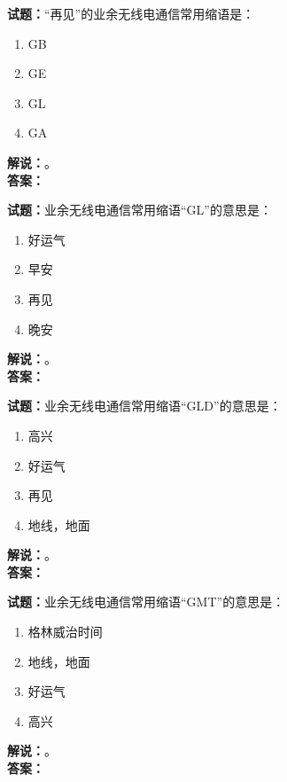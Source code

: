 \documentclass{ctexbook}
\begin{document}
\noindent\textbf{试题：}“再见”的业余无线电通信常用缩语是：
\begin{enumerate}[leftmargin=3em]
  \item GB
  \item GE
  \item GL
  \item GA
\end{enumerate}
\noindent\textbf{解说：}\textbf{}。\\\noindent\textbf{答案：}

\vspace{\baselineskip}

\noindent\textbf{试题：}业余无线电通信常用缩语“GL”的意思是：
\begin{enumerate}[leftmargin=3em]
  \item 好运气
  \item 早安
  \item 再见
  \item 晚安
\end{enumerate}
\noindent\textbf{解说：}\textbf{}。\\\noindent\textbf{答案：}

\vspace{\baselineskip}

\noindent\textbf{试题：}业余无线电通信常用缩语“GLD”的意思是：
\begin{enumerate}[leftmargin=3em]
  \item 高兴
  \item 好运气
  \item 再见
  \item 地线，地面
\end{enumerate}
\noindent\textbf{解说：}\textbf{}。\\\noindent\textbf{答案：}

\vspace{\baselineskip}

\noindent\textbf{试题：}业余无线电通信常用缩语“GMT”的意思是：
\begin{enumerate}[leftmargin=3em]
  \item 格林威治时间
  \item 地线，地面
  \item 好运气
  \item 高兴
\end{enumerate}
\noindent\textbf{解说：}\textbf{}。\\\noindent\textbf{答案：}

\vspace{\baselineskip}
\end{document}
